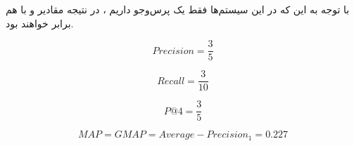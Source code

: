 \begin{boxA}
    با توجه به این که در این سیستم‌ها فقط یک پرس‌وجو داریم ،
    در نتیجه مقادیر 
    و 
    با هم برابر خواهند بود.
    
\end{boxA}

\begin{boxC}
    \begin{equation*}
        Precision = \frac{3}{5}
    \end{equation*}

    \begin{equation*}
        Recall = \frac{3}{10}
    \end{equation*}

    \begin{equation*}
        P@4 = \frac{3}{5} %
    \end{equation*}


    \begin{equation*}
        MAP = GMAP = Average-Precision_1 = 0.227 %
    \end{equation*}

\end{boxC}